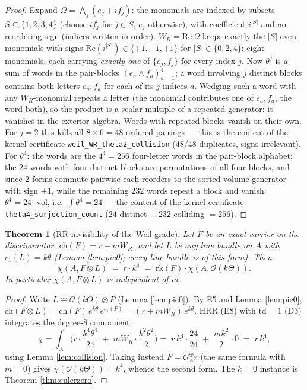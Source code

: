\documentclass[11pt]{article}
\newtheorem{theorem}{Theorem}
\begin{document}
\begin{proof}
Expand $\Omega=\bigwedge_j(e_j+if_j)$: the monomials are indexed by subsets
$S\subseteq\{1,2,3,4\}$ (choose $if_j$ for $j\in S$, $e_j$ otherwise), with coefficient
$i^{|S|}$ and no reordering sign (indices written in order). $W_R=\mathrm{Re}\,\Omega$ keeps exactly the
$|S|$ even monomials with signs $\mathrm{Re}(i^{|S|})\in\{+1,-1,+1\}$ for $|S|\in\{0,2,4\}$: eight
monomials, each carrying \emph{exactly one} of $\{e_j,f_j\}$ for every index $j$. Now
$\theta^j$ is a sum of words in the pair-blocks $(e_a\wedge f_a)_{a=1}^4$; a word involving $j$ distinct
blocks contains both letters $e_a,f_a$ for each of its $j$ indices $a$. Wedging such a word with any
$W_R$-monomial repeats a letter (the monomial contributes one of $e_a,f_a$, the word both), so the product
is a scalar multiple of a repeated generator: it vanishes in the exterior algebra. Words with repeated
blocks vanish on their own. For $j=2$ this kills all $8\times6=48$ ordered pairings --- this is the
content of the kernel certificate \texttt{weil\_WR\_theta2\_collision} (48/48 duplicates, signs
irrelevant). For $\theta^4$: the words are the $4^4=256$ four-letter words in the pair-block alphabet;
the $24$ words with four distinct blocks are permutations of all four blocks, and since $2$-forms commute
pairwise each reorders to the sorted volume generator with sign $+1$, while the remaining $232$ words
repeat a block and vanish: $\theta^4=24\cdot\mathrm{vol}$, i.e.\ $\int\theta^4=24$ --- the content of
the kernel certificate \texttt{theta4\_surjection\_count} ($24$ distinct $+\;232$ colliding $=256$).
\end{proof}

\begin{theorem}[RR-invisibility of the Weil grade]\label{thm:invisible}
Let $F$ be an exact carrier on the discriminator, $\mathrm{ch}(F)=r+mW_R$, and let $L$ be any line bundle
on $A$ with $c_1(L)=k\theta$ (Lemma \ref{lem:pic0}; every line bundle is of this form). Then
\[
\chi(A,F\otimes L)\;=\;r\cdot k^4\;=\;\mathrm{rk}(F)\cdot\chi(A,\mathcal{O}(k\Theta)) .
\]
In particular $\chi(A,F\otimes L)$ is independent of $m$.
\end{theorem}

\begin{proof}
Write $L\cong\mathcal{O}(k\Theta)\otimes P$ (Lemma \ref{lem:pic0}). By E5 and Lemma \ref{lem:pic0},
$\mathrm{ch}(F\otimes L)=\mathrm{ch}(F)\,e^{k\theta}\,e^{c_1(P)}=(r+mW_R)\,e^{k\theta}$. HRR (E8) with
$\mathrm{td}=1$ (D3) integrates the degree-$8$ component:
\[
\chi=\int_A\Big(r\cdot\frac{k^4\theta^4}{24}\;+\;mW_R\cdot\frac{k^2\theta^2}{2}\Big)
=\;r\,k^4\cdot\frac{24}{24}\;+\;\frac{mk^2}{2}\cdot 0\;=\;r\,k^4 ,
\]
using Lemma \ref{lem:collision}. Taking instead $F=\mathcal{O}_A^\oplus r$ (the same formula with $m=0$)
gives $\chi(\mathcal{O}(k\Theta))=k^4$, whence the second form. The $k=0$ instance is Theorem
\ref{thm:eulerzero}.
\end{proof}
\end{document}
